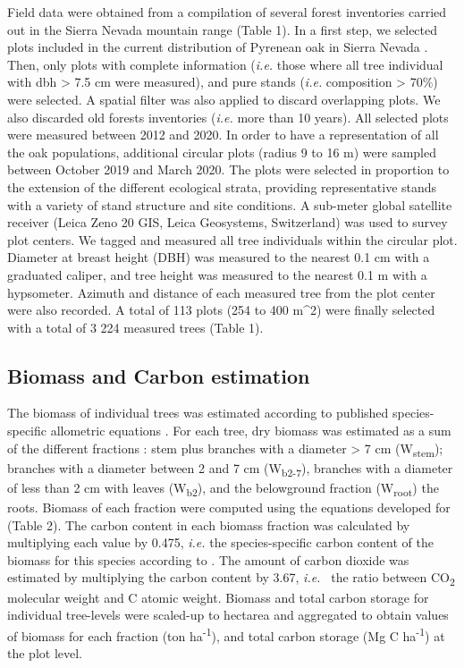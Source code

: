 Field data were obtained from a compilation of several forest inventories carried out in the Sierra Nevada mountain range (Table 1). In a first step, we selected plots included in the current distribution of Pyrenean oak in Sierra Nevada \autocite{PerezLuqueetal2019MapEcosystems}. Then, only plots with complete information (\emph{i.e.} those where all tree individual with dbh \textgreater{} 7.5 cm were measured), and pure stands (\emph{i.e.} \Qp composition \textgreater{} 70\%) were selected. A spatial filter was also applied to discard overlapping plots. We also discarded old forests inventories (\emph{i.e.} more than 10 years). All selected plots were measured between 2012 and 2020. In order to have a representation of all the oak populations, additional circular plots (radius 9 to 16 m) were sampled between October 2019 and March 2020. The plots were selected in proportion to the extension of the different ecological strata, providing representative stands with a variety of stand structure and site conditions. A sub-meter global satellite receiver (Leica Zeno 20 GIS, Leica Geosystems, Switzerland) was used to survey plot centers. We tagged and measured all tree individuals within the circular plot. Diameter at breast height (DBH) was measured to the nearest 0.1 cm with a graduated caliper, and tree height was measured to the nearest 0.1 m with a hypsometer. Azimuth and distance of each measured tree from the plot center were also recorded. A total of 113 plots (254 to 400 m\^{}2) were finally selected with a total of 3 224 measured trees (Table 1).

\subsection{Biomass and Carbon estimation}\label{sec:carbon:mat-biomass}

The biomass of individual trees was estimated according to published species-specific allometric equations \autocite{RuizPeinadoetal2012BiomassModels}. For each tree, dry biomass was estimated as a sum of the different fractions \autocite{CarvalhoParresol2003AdditivityTree}: stem plus branches with a diameter \textgreater{} 7 cm (W\textsubscript{stem}); branches with a diameter between 2 and 7 cm (W\textsubscript{b2-7}), branches with a diameter of less than 2 cm with leaves (W\textsubscript{b2}), and the belowground fraction (W\textsubscript{root}) the roots. Biomass of each fraction were computed using the equations developed for \Qp \autocite{RuizPeinadoetal2012BiomassModels} (Table 2).
The carbon content in each biomass fraction was calculated by multiplying each value by 0.475, \emph{i.e.} the species-specific carbon content of the biomass for this species according to \autocite{Ibanezetal2002MetodologiaComplementaria,Monteroetal2005ProduccionBiomasa}. The amount of carbon dioxide was estimated by multiplying the carbon content by 3.67, \emph{i.e.~} the ratio between CO\textsubscript{2} molecular weight and C atomic weight. Biomass and total carbon storage for individual tree-levels were scaled-up to hectarea and aggregated to obtain values of biomass for each fraction (ton ha\textsuperscript{-1}), and total carbon storage (Mg C ha\textsuperscript{-1}) at the plot level.

